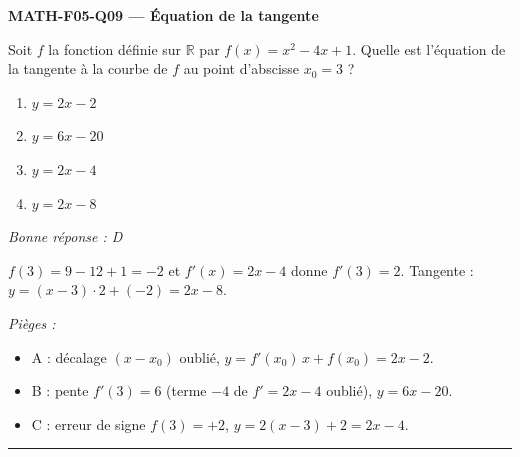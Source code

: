 \documentclass[11pt,a4paper]{article}
\newcommand{\R}{\mathbb{R}}\newcommand{\N}{\mathbb{N}}\newcommand{\Z}{\mathbb{Z}}
\begin{document}
\noindent\textbf{MATH-F05-Q09 --- Équation de la tangente}\par
Soit $f$ la fonction définie sur $\R$ par $f(x)=x^2-4x+1$. Quelle est l'équation de la tangente à la courbe de $f$ au point d'abscisse $x_0=3$ ?
\begin{enumerate}[label=\Alph*)]
\item $y=2x-2$
\item $y=6x-20$
\item $y=2x-4$
\item $y=2x-8$
\end{enumerate}
\textit{Bonne réponse : D}\par
$f(3)=9-12+1=-2$ et $f'(x)=2x-4$ donne $f'(3)=2$. Tangente : $y=(x-3)\cdot 2+(-2)=2x-8$.\par
\textit{Pièges :}
\begin{itemize}
\item A : décalage $(x-x_0)$ oublié, $y=f'(x_0)\,x+f(x_0)=2x-2$.
\item B : pente $f'(3)=6$ (terme $-4$ de $f'=2x-4$ oublié), $y=6x-20$.
\item C : erreur de signe $f(3)=+2$, $y=2(x-3)+2=2x-4$.
\end{itemize}
\vspace{8pt}\hrule\vspace{8pt}
\end{document}
